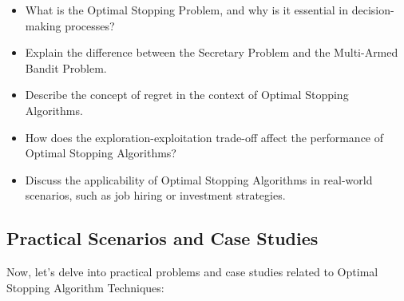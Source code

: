 \documentclass[12pt]{book} %
\begin{document}
\begin{itemize}
    \item What is the Optimal Stopping Problem, and why is it essential in decision-making processes?
    \item Explain the difference between the Secretary Problem and the Multi-Armed Bandit Problem.
    \item Describe the concept of regret in the context of Optimal Stopping Algorithms.
    \item How does the exploration-exploitation trade-off affect the performance of Optimal Stopping Algorithms?
    \item Discuss the applicability of Optimal Stopping Algorithms in real-world scenarios, such as job hiring or investment strategies.
\end{itemize}

\subsection{Practical Scenarios and Case Studies}
Now, let's delve into practical problems and case studies related to Optimal Stopping Algorithm Techniques:
\end{document}
